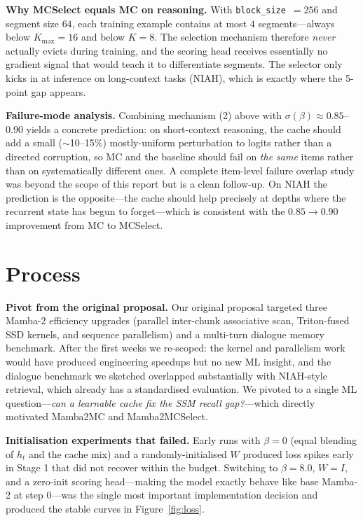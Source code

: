 \documentclass[conference]{IEEEtran}
\begin{document}
\textbf{Why MCSelect equals MC on reasoning.} With \texttt{block\_size}~$=256$ and segment size $64$, each training example contains at most $4$ segments---always below $K_{\max}{=}16$ and below $K{=}8$. The selection mechanism therefore \emph{never} actually evicts during training, and the scoring head receives essentially no gradient signal that would teach it to differentiate segments. The selector only kicks in at inference on long-context tasks (NIAH), which is exactly where the 5-point gap appears.

\textbf{Failure-mode analysis.} Combining mechanism (2) above with $\sigma(\beta)\!\approx\!0.85$--$0.90$ yields a concrete prediction: on short-context reasoning, the cache should add a small ($\sim$10--15\%) mostly-uniform perturbation to logits rather than a directed corruption, so MC and the baseline should fail on \emph{the same} items rather than on systematically different ones. A complete item-level failure overlap study was beyond the scope of this report but is a clean follow-up. On NIAH the prediction is the opposite---the cache should help precisely at depths where the recurrent state has begun to forget---which is consistent with the $0.85\!\to\!0.90$ improvement from MC to MCSelect.

\section{Process}
\label{sec:process}

\textbf{Pivot from the original proposal.} Our original proposal targeted three Mamba-2 efficiency upgrades (parallel inter-chunk associative scan, Triton-fused SSD kernels, and sequence parallelism) and a multi-turn dialogue memory benchmark. After the first weeks we re-scoped: the kernel and parallelism work would have produced engineering speedups but no new ML insight, and the dialogue benchmark we sketched overlapped substantially with NIAH-style retrieval, which already has a standardised evaluation. We pivoted to a single ML question---\emph{can a learnable cache fix the SSM recall gap?}---which directly motivated Mamba2MC and Mamba2MCSelect.

\textbf{Initialisation experiments that failed.} Early runs with $\beta=0$ (equal blending of $h_t$ and the cache mix) and a randomly-initialised $W$ produced loss spikes early in Stage 1 that did not recover within the budget. Switching to $\beta=8.0$, $W=I$, and a zero-init scoring head---making the model exactly behave like base Mamba-2 at step 0---was the single most important implementation decision and produced the stable curves in Figure~\ref{fig:loss}.
\end{document}
